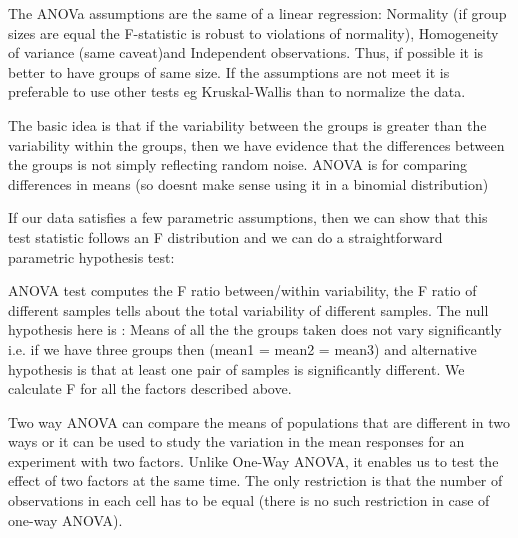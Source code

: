 \documentclass[11pt]{article}
\theoremstyle{definition}
\theoremstyle{remark}
\begin{document}
The ANOVa assumptions are the same of a linear regression: Normality (if group sizes are equal the F-statistic is robust to violations of normality), Homogeneity of variance (same caveat)and Independent observations. Thus, if possible it is better to have groups of same size. If the assumptions are not meet it is preferable to use other tests eg Kruskal-Wallis than to normalize the data.

The basic idea is that if the variability between the groups is greater than the variability within the groups, then we have evidence that the differences between the groups is not simply reflecting random noise.
ANOVA is for comparing differences in means (so doesnt make sense using it in a binomial distribution)

If our data satisfies a few parametric assumptions, then we can show that this test statistic follows an F distribution and we can do a straightforward parametric hypothesis test:

ANOVA test computes the F ratio between/within variability, the F ratio of different samples tells about the total variability of different samples.
The null hypothesis here is : Means of all the the groups taken does not vary significantly i.e. if we have three groups then (mean1 = mean2 = mean3) and alternative hypothesis is that at least one pair of samples is significantly different.
We calculate F for all the factors described above.


Two way ANOVA can compare the means of populations that are different in two ways or it can be used to study the variation in the mean responses for an experiment with two factors. Unlike One-Way ANOVA, it enables us to test the effect of two factors at the same time. The only restriction is that the number of observations in each cell has to be equal (there is no such restriction in case of one-way ANOVA).


\end{document}
